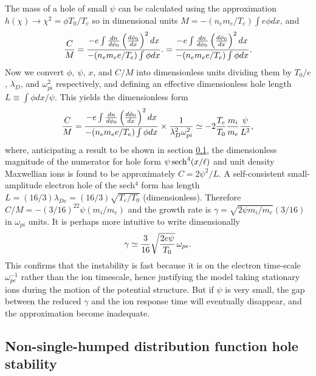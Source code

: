 \documentclass[pre]{revtex4-2}
\begin{document}
The mass of a hole of small $\psi$ can be calculated using the
approximation $h(\chi)\to \chi^2=\phi T_0/T_e$ so in dimensional units
$M=-(n_em_e/T_e)\int e\phi dx$, and
\begin{equation}
  \label{eq:CbyM}
  {C\over M}= {-e\int {dn\over d\phi_0}\left(d\phi_0\over dx\right)^2 dx
    \over -(n_em_ee/T_e)\int \phi dx }.
  ={-e\int {dn\over d\phi_0}\left(d\phi_0\over dx\right)^2 dx
    \over -(n_em_ee/T_e)\int \phi dx }.
\end{equation}
Now we convert $\phi,\ \psi$, $x$, and $C/M$ into dimensionless units
dividing them by $T_0/e$, $\lambda_D$, and $\omega_{pi}^2$
respectively, and defining an effective dimensionless hole length
$L\equiv\int\phi dx/\psi$. This yields the dimensionless form
\begin{equation}
  \label{eq:CbyMless}
   {C\over M}= {-e\int {dn\over d\phi_0}\left(d\phi_0\over dx\right)^2 dx
     \over -(n_em_ee/T_e)\int \phi dx } \times {1\over
     \lambda_D^2 \omega_{pi}^2}
   \simeq -2 {T_e\over T_0} {m_i\over m_e} {\psi \over L^2},
 \end{equation}
 where, anticipating a result to be shown in section \ref{section2.3},
 the dimensionless magnitude of the numerator for hole form
 $\psi\, {\rm sech}^4(x/\ell)$ and unit density Maxwellian ions is
 found to be approximately $C=2\psi^2/L$.  A self-consistent
 small-amplitude electron hole of the sech$^4$ form has length
 $L=(16/3)\lambda_{De}= (16/3)\sqrt{T_e/T_0}$ (dimensionless).
 Therefore $C/M=-(3/16)^22\psi (m_i/m_e)$ and the growth rate is
 $\gamma=\sqrt{2\psi m_i/m_e}(3/16)$ in $\omega_{pi}$ units. It is
 perhaps more intuitive to write dimensionally
 \begin{equation}
   \label{eq:gamma}
 \gamma\simeq{3\over 16}\sqrt{2e\psi\over T_0}\,\omega_{pe}.   
 \end{equation}
 This confirms that the
 instability is fast because it is on the electron time-scale
 $\omega_{pe}^{-1}$ rather than the ion timescale, hence justifying
 the model taking stationary ions during the motion of the potential
 structure. But if $\psi$ is very small, the gap between the reduced
 $\gamma$ and the ion response time will eventually disappear, and the
 approximation become inadequate.



\subsection{Non-single-humped distribution function hole stability}
\label{section2.3}
\end{document}
